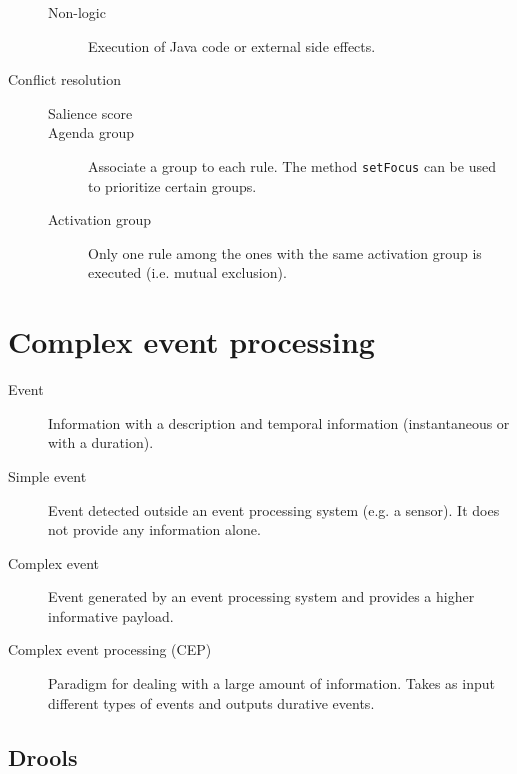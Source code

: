 \begin{description}
\begin{description}
            \item[Non-logic]
                Execution of Java code or external side effects.
        \end{description}

    \item[Conflict resolution] \phantom{}
        \begin{description}
            \item[Salience score]
            \item[Agenda group]
                Associate a group to each rule. The method \texttt{setFocus} can be used to prioritize certain groups.
            \item[Activation group]
                Only one rule among the ones with the same activation group is executed (i.e. mutual exclusion).
        \end{description}
\end{description}



\section{Complex event processing}

\begin{description}
    \item[Event] 
        Information with a description and temporal information (instantaneous or with a duration).

    \item[Simple event] 
        Event detected outside an event processing system (e.g. a sensor). It does not provide any information alone.

    \item[Complex event] 
        Event generated by an event processing system and provides a higher informative payload.

    \item[Complex event processing (CEP)] 
        Paradigm for dealing with a large amount of information.
        Takes as input different types of events and outputs durative events.
\end{description}


\subsection{Drools}


